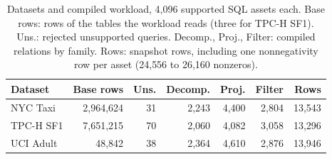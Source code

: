 \begin{table}[t]
\centering
\caption{Datasets and compiled workload, 4{,}096 supported SQL assets each. Base rows: rows of the tables the workload reads (three for TPC-H SF1). Uns.: rejected unsupported queries. Decomp., Proj., Filter: compiled relations by family. Rows: snapshot rows, including one nonnegativity row per asset (24{,}556 to 26{,}160 nonzeros).}
\label{tab:data}
\footnotesize
\setlength{\tabcolsep}{2.5pt}
\begin{tabular}{@{}lrrrrrr@{}}
\toprule
Dataset & Base rows & Uns. & Decomp. & Proj. & Filter & Rows \\
\midrule
NYC Taxi & 2{,}964{,}624 & 31 & 2{,}243 & 4{,}400 & 2{,}804 & 13{,}543 \\
TPC-H SF1 & 7{,}651{,}215 & 70 & 2{,}060 & 4{,}082 & 3{,}058 & 13{,}296 \\
UCI Adult & 48{,}842 & 38 & 2{,}364 & 4{,}610 & 2{,}876 & 13{,}946 \\
\bottomrule
\end{tabular}
\end{table}
